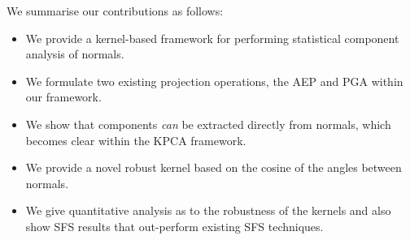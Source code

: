 We summarise our contributions as follows:
\begin{itemize}

  \item We provide a kernel-based framework for performing statistical component analysis of normals.
  \item We formulate two existing projection operations, the AEP and PGA within our framework.
  \item We show that components \textit{can} be extracted directly from normals, which becomes clear within the KPCA framework.
  \item We provide a novel robust kernel based on the cosine of the angles between normals.
  \item We give quantitative analysis as to the robustness of the kernels and also show SFS results that out-perform existing SFS techniques.

\end{itemize}
